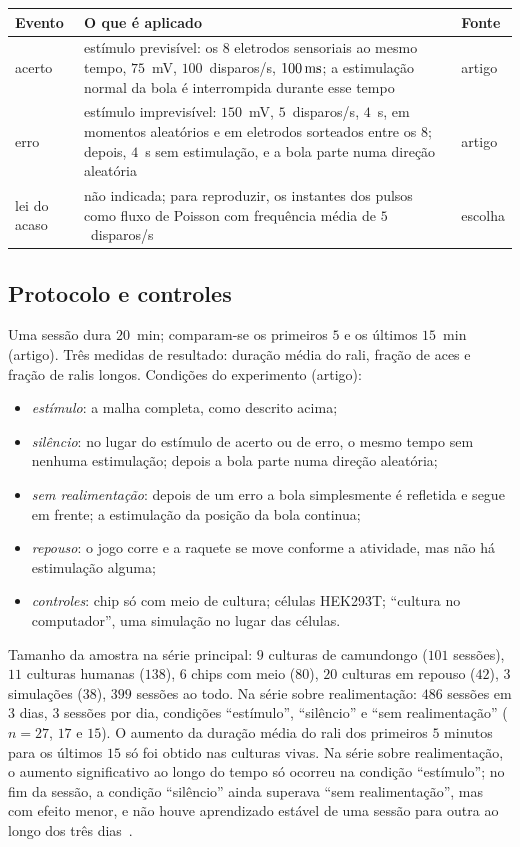 \begin{center}
\footnotesize
\setlength{\tabcolsep}{4pt}
\renewcommand{\arraystretch}{1.15}
\begin{tabular}{>{\raggedright}p{2.6cm}>{\raggedright}p{8.3cm}>{\raggedright\arraybackslash}p{1.6cm}}
\toprule
Evento & O que é aplicado & Fonte \\
\midrule
acerto & estímulo previsível: os $8$ eletrodos sensoriais ao mesmo tempo, $75$~mV, $100$~disparos/s, $100\,\text{ms}$; a estimulação normal da bola é interrompida durante esse tempo & artigo \\
erro & estímulo imprevisível: $150$~mV, $5$~disparos/s, $4$~s, em momentos aleatórios e em eletrodos sorteados entre os $8$; depois, $4$~s sem estimulação, e a bola parte numa direção aleatória & artigo \\
lei do acaso & não indicada; para reproduzir, os instantes dos pulsos como fluxo de Poisson com frequência média de $5$~disparos/s & escolha \\
\bottomrule
\end{tabular}
\end{center}

\subsection*{Protocolo e controles}

Uma sessão dura $20$~min; comparam-se os primeiros $5$ e os últimos $15$~min (artigo). Três medidas de resultado: duração média do rali, fração de aces e fração de ralis longos. Condições do experimento (artigo):
\begin{itemize}
\item \emph{estímulo}: a malha completa, como descrito acima;
\item \emph{silêncio}: no lugar do estímulo de acerto ou de erro, o mesmo tempo sem nenhuma estimulação; depois a bola parte numa direção aleatória;
\item \emph{sem realimentação}: depois de um erro a bola simplesmente é refletida e segue em frente; a estimulação da posição da bola continua;
\item \emph{repouso}: o jogo corre e a raquete se move conforme a atividade, mas não há estimulação alguma;
\item \emph{controles}: chip só com meio de cultura; células HEK293T; ``cultura no computador'', uma simulação no lugar das células.
\end{itemize}
Tamanho da amostra na série principal: $9$ culturas de camundongo ($101$ sessões), $11$ culturas humanas ($138$), $6$ chips com meio ($80$), $20$ culturas em repouso ($42$), $3$ simulações ($38$), $399$ sessões ao todo. Na série sobre realimentação: $486$ sessões em $3$ dias, $3$ sessões por dia, condições ``estímulo'', ``silêncio'' e ``sem realimentação'' ($n=27$, $17$ e $15$). O aumento da duração média do rali dos primeiros $5$ minutos para os últimos $15$ só foi obtido nas culturas vivas. Na série sobre realimentação, o aumento significativo ao longo do tempo só ocorreu na condição ``estímulo''; no fim da sessão, a condição ``silêncio'' ainda superava ``sem realimentação'', mas com efeito menor, e não houve aprendizado estável de uma sessão para outra ao longo dos três dias~\cite{Kagan2022}.

